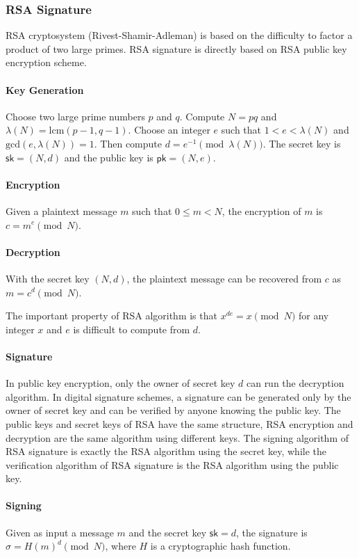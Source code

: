 \subsubsection{RSA Signature}
RSA cryptosystem (Rivest-Shamir-Adleman) is based on the difficulty to factor a product of two large primes. RSA signature is directly based on RSA public key encryption scheme. 

\paragraph{Key Generation} Choose two large prime numbers $p$ and $q$. Compute $N=pq$ and $\lambda(N) = \mathrm{lcm}(p-1, q-1)$. Choose an integer $e$ such that $1<e < \lambda(N)$ and $\mathrm{gcd}(e, \lambda(N)) = 1$. Then compute $d=e^{-1}\pmod{\lambda(N)}$. The secret key is $\mathsf{sk}=(N, d)$ and the public key is $\mathsf{pk}=(N,e)$. 

\paragraph{Encryption} Given a plaintext message $m$ such that $0\le m < N$, the encryption of $m$ is $c=m^e\pmod{N}$. 

\paragraph{Decryption} With the secret key $(N, d)$, the plaintext message can be recovered from $c$ as $m = c^d\pmod{N}$. 

The important property of RSA algorithm is that $x^{de}=x\pmod{N}$ for any integer $x$ and $e$ is difficult to compute from $d$. 

\paragraph{Signature} In public key encryption, only the owner of secret key $d$ can run the decryption algorithm. In digital signature schemes, a signature can be generated only by the owner of secret key and can be verified by anyone knowing the public key. The public keys and secret keys of RSA have the same structure, RSA encryption and decryption are the same algorithm using different keys. The signing algorithm of RSA signature is exactly the RSA algorithm using the secret key, while the verification algorithm of RSA signature is the RSA algorithm using the public key. 

\paragraph{Signing} Given as input a message $m$ and the secret key $\mathsf{sk}=d$, the signature is $\sigma= H(m)^d \pmod{N}$, where $H$ is a cryptographic hash function. 

